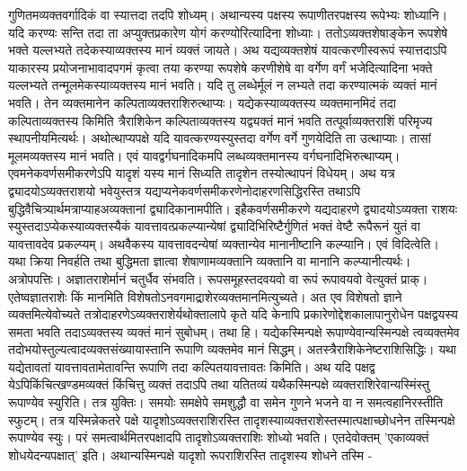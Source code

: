 \documentclass[11pt, openany]{book}
\begin{document}
\begin{sloppypar}
\hangindent=0.2in गुणितमव्यक्तवर्गादिकं वा स्यात्तदा तदपि शोध्यम्। अथान्यस्य पक्षस्य रूपाणीतरपक्षस्य रूपेभ्यः शोध्यानि। यदि करण्यः सन्ति तदा ता अप्युक्तप्रकारेण योगं करण्योरित्यादिना शोध्याः। ततोऽव्यक्तशेषाङ्केन रूपशेषे भक्ते यल्लभ्यते तदेकस्याव्यक्तस्य मानं व्यक्तं जायते। अथ यद्यव्यक्तशेषं यावत्करणीस्वरूपं स्यात्तदाऽपि याकारस्य प्रयोजनाभावादपगमं कृत्वा तया करण्या रूपशेषे करणीशेषे वा वर्गेण वर्गं भजेदित्यादिना भक्ते यल्लभ्यते तन्मूलमेकस्याव्यक्तस्य मानं भवति। यदि तु लब्धेर्मूलं न लभ्यते तदा करण्यात्मकं व्यक्तं मानं भवति। तेन व्यक्तमानेन कल्पिताव्यक्तराशिरुत्थाप्यः। यद्येकस्याव्यक्तस्य व्यक्तमानमिदं तदा कल्पिताव्यक्तस्य किमिति त्रैराशिकेन कल्पिताव्यक्तस्य यद्व्यक्तं मानं भवति तत्पूर्वाव्यक्तराशिं परिमृज्य स्थापनीयमित्यर्थः। अथोत्थाप्यपक्षे यदि यावत्करण्यस्युस्तदा वर्गेण वर्गे गुणयेदिति ता उत्थाप्याः। तासां मूलमव्यक्तस्य मानं भवति। एवं यावद्वर्गघनादिकमपि लब्धव्यक्तमानस्य वर्गघनादिभिरुत्थाप्यम्। एवमनेकवर्णसमीकरणेऽपि यादृशं यस्य मानं सिध्यति तादृशेन तस्योत्थापनं विधेयम्। अथ यत्र द्व्यादयोऽव्यक्तराशयो भवेयुस्तत्र यद्यप्यनेकवर्णसमीकरणेनोदाहरणसिद्धिरस्ति तथाऽपि बुद्धिवैचित्र्यार्थमत्राप्याह\textendash अव्यक्तानां द्व्यादिकानामपीति। इहैकवर्णसमीकरणे यद्यदाहरणे द्व्यादयोऽव्यक्ता राशयः स्युस्तदाऽप्येकस्याव्यक्तस्यैकं यावत्तावत्प्रकल्प्यान्येषां द्व्यादिभिरिष्टैर्गुणितं भक्तं वेष्टै रूपैरूनं युतं वा यावत्तावदेव प्रकल्प्यम्। अथवैकस्य यावत्तावदन्येषां व्यक्तान्येव मानानीष्टानि कल्प्यानि। एवं विदित्वेति। यथा क्रिया निवर्हति तथा बुद्धिमता ज्ञात्वा शेषाणामव्यक्तानि व्यक्तानि वा मानानि कल्प्यानीत्यर्थः। अत्रोपपत्तिः। अज्ञातराशेर्मानं चतुर्धैव संभवति। रूपसमूहस्तदवयवो वा रूपं रूपावयवो वेत्युक्तं प्राक्। एतेष्वज्ञातराशेः किं मानमिति विशेषतोऽनवगमाद्राशेरव्यक्तमानमित्युच्यते। अत एव विशेषतो ज्ञाने व्यक्तमित्येवोच्यते तत्रोदाहरणेऽव्यक्तराशेर्यथोक्तालापे कृते यदि केनापि प्रकारेणोद्देशकालापानुरोधेन पक्षद्वयस्य समता भवति तदाऽव्यक्तस्य व्यक्तं मानं सुबोधम्। तथा हि। यद्येकस्मिन्पक्षे रूपाण्येवान्यस्मिन्पक्षे त्वव्यक्तमेव तदोभयोस्तुल्यत्वादव्यक्तसंख्यायास्तानि रूपाणि व्यक्तमेव मानं सिद्धम्। अतस्त्रैराशिकेनेष्टराशिसिद्धिः। यथा यद्येतावतां यावत्तावतामेतावन्ति रूपाणि तदा कल्पितयावत्तावतः किमिति। अथ यदि पक्षद्व येऽपिकिंचित्खण्डमव्यक्तं किंचित्तु व्यक्तं तदाऽपि तथा यतितव्यं यथैकस्मिन्पक्षे व्यक्तराशिरेवान्यस्मिंस्तु रूपाण्येव स्युरिति। तत्र युक्तिः। समयोः समक्षेपे समशुद्धौ वा समेन गुणने भजने वा न समत्वहानिरस्तीति स्फुटम्। तत्र यस्मिन्नेकतरे पक्षे यादृशोऽव्यक्तराशिरस्ति तादृशस्याव्यक्तराशेस्तस्मात्पक्षाच्छोधनेन तस्मिन्पक्षे रूपाण्येव स्युः। परं समत्वार्थमितरपक्षादपि तादृशोऽव्यक्तराशिः शोध्यो भवति। एतदेवोक्तम् 'एकाव्यक्तं शोधयेदन्यपक्षात्' इति। अथान्यस्मिन्पक्षे यादृशो रूपराशिरस्ति तादृशस्य शोधने तस्मि -
\end{sloppypar}
\thispagestyle{empty}
\newpage
\end{document}

